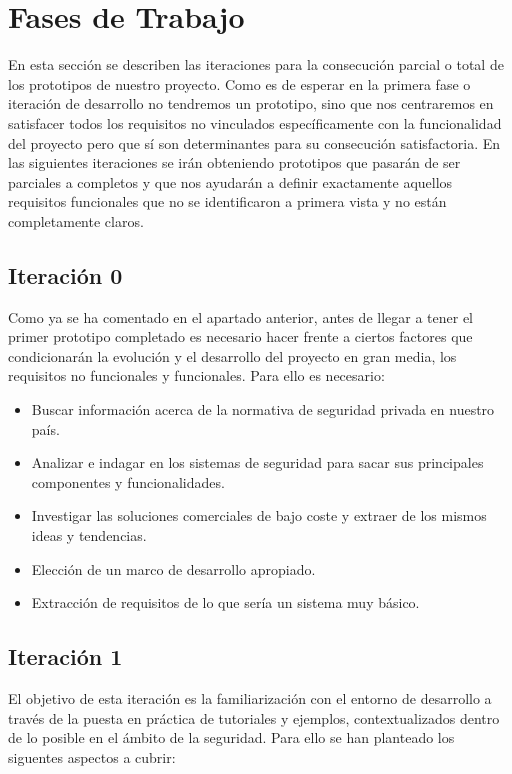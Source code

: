 \section{Fases de Trabajo}
\label{sec:fasesdetrabajo}

En esta sección se describen las iteraciones para la consecución parcial o total de los prototipos de nuestro proyecto. Como es de esperar en la primera fase o iteración de desarrollo no tendremos un prototipo, sino que nos centraremos en satisfacer todos los requisitos no vinculados específicamente con la funcionalidad del proyecto pero que sí son determinantes para su consecución satisfactoria. En las siguientes iteraciones se irán obteniendo prototipos que pasarán de ser parciales a completos y que nos ayudarán a definir exactamente aquellos requisitos funcionales que no se identificaron a primera vista y no están completamente claros.

\subsection{Iteración 0}
\label{sub:metodologiaiter0}

Como ya se ha comentado en el apartado anterior, antes de llegar a tener el primer prototipo completado es necesario hacer frente a ciertos factores que condicionarán la evolución y el desarrollo del proyecto en gran media, los requisitos no funcionales y funcionales. Para ello es necesario:

\begin{itemize}
\item Buscar información acerca de la normativa de seguridad privada en nuestro país.
\item Analizar e indagar en los sistemas de seguridad para sacar sus principales componentes y funcionalidades.
\item Investigar las soluciones comerciales de bajo coste y extraer de los mismos ideas y tendencias.
\item Elección de un marco de desarrollo apropiado.
\item Extracción de requisitos de lo que sería un sistema muy básico.
\end{itemize}

\subsection{Iteración 1}
\label{sub:metodologiaiter1}

El objetivo de esta iteración es la familiarización con el entorno de desarrollo a través de la puesta en práctica de tutoriales y ejemplos, contextualizados dentro de lo posible en el ámbito de la seguridad. Para ello se han planteado los siguentes aspectos a cubrir:

